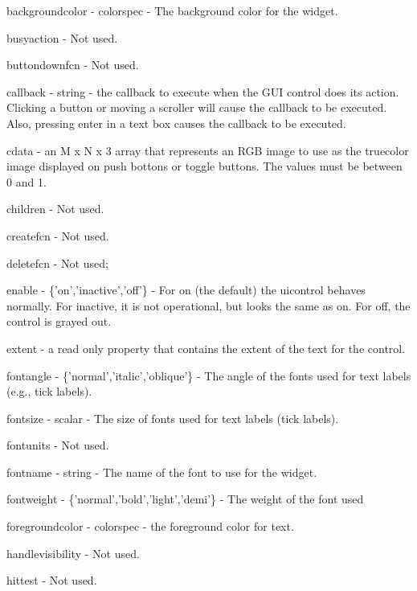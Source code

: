 \begin{DoxyItemize}
\item {\ttfamily backgroundcolor} -\/ {\ttfamily colorspec} -\/ The background color for the widget.  
\item {\ttfamily busyaction} -\/ Not used.  
\item {\ttfamily buttondownfcn} -\/ Not used.  
\item {\ttfamily callback} -\/ {\ttfamily string} -\/ the callback to execute when the G\-U\-I control does its action. Clicking a button or moving a scroller will cause the callback to be executed. Also, pressing enter in a text box causes the callback to be executed.  
\item {\ttfamily cdata} -\/ an {\ttfamily M x N x 3} array that represents an R\-G\-B image to use as the truecolor image displayed on push bottons or toggle buttons. The values must be between 0 and 1.  
\item {\ttfamily children} -\/ Not used.  
\item {\ttfamily createfcn} -\/ Not used.  
\item {\ttfamily deletefcn} -\/ Not used;  
\item {\ttfamily enable} -\/ {\ttfamily \{'on','inactive','off'\}} -\/ For {\ttfamily on} (the default) the uicontrol behaves normally. For inactive, it is not operational, but looks the same as {\ttfamily on}. For {\ttfamily off}, the control is grayed out.  
\item {\ttfamily extent} -\/ a read only property that contains the extent of the text for the control.  
\item {\ttfamily fontangle} -\/ {\ttfamily \{'normal','italic','oblique'\}} -\/ The angle of the fonts used for text labels (e.\-g., tick labels).  
\item {\ttfamily fontsize} -\/ {\ttfamily scalar} -\/ The size of fonts used for text labels (tick labels).  
\item {\ttfamily fontunits} -\/ Not used.  
\item {\ttfamily fontname} -\/ {\ttfamily string} -\/ The name of the font to use for the widget.  
\item {\ttfamily fontweight} -\/ {\ttfamily \{'normal','bold','light','demi'\}} -\/ The weight of the font used  
\item {\ttfamily foregroundcolor} -\/ {\ttfamily colorspec} -\/ the foreground color for text.  
\item {\ttfamily handlevisibility} -\/ Not used.  
\item {\ttfamily hittest} -\/ Not used.  

\end{DoxyItemize}

